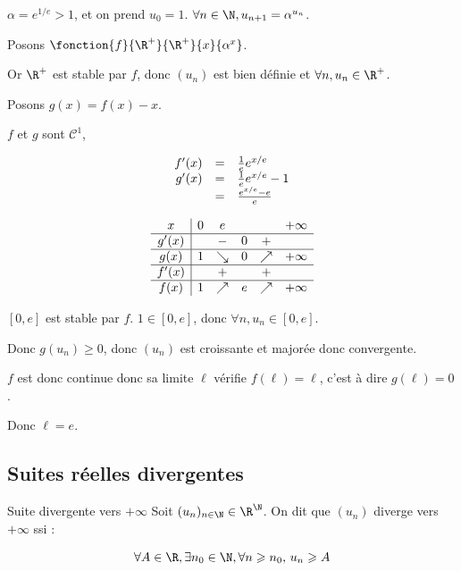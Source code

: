 \begin{exemple}
    \avspace $\alpha = e^{1/e} > 1$, et on prend $u_0 = 1$. $\forall n \in \N, u_{n + 1} = \alpha^{u_n}$.

    Posons $\fonction{f}{\R^+}{\R^+}{x}{\alpha^x}$.

    Or $\R^+$ est stable par $f$, donc $(u_n)$ est bien définie et $\forall n, u_n \in \R^+$.

    Posons $g(x) = f(x) - x$. 

    $f$ et $g$ sont $\mathscr C^1$, 

    $$\begin{array}{rcl}
        f'(x) & = & \frac 1 e e^{x/e} \\
        g'(x) & = & \frac 1 e e^{x/e} - 1 \\
        \space & = & \frac{e^{x / e} - e}{e} \\
    \end{array}
    $$

    $$
    \begin{array}{c|ccccc}
        x & 0 \space & e \space & & & + \infty \\
        \hline
        g'(x) & \space & - & 0 & + & \space \\
        \hline
        g(x) & 1 & \searrow & 0 & \nearrow & +\infty \\
        \hline
        f'(x) & \space & + & \space & + & \space \\
        \hline
        f(x) & 1 & \nearrow &  e & \nearrow & +\infty \\
    \end{array}
    $$

    $[0, e]$ est stable par $f$. $1 \in [0, e]$, donc $\forall n, u_n \in [0, e]$.

    Donc $g(u_n) \geqslant 0$, donc $(u_n)$ est croissante et majorée donc convergente. 

    $f$ est donc continue donc sa limite $\ell$ vérifie $f(\ell) = \ell$, c'est à dire 
    $g(\ell) = 0$.

    Donc $\ell = e$.
\end{exemple}

\subsection{Suites réelles divergentes}

\begin{definitionnt}{Suite divergente vers $+\infty$}{}
    Soit $(u_n)_{n \in \N} \in \R^{\N}$. On dit que $(u_n)$ diverge vers $+\infty$ ssi : 

    $$\forall A \in \R, \exists n_0 \in \N, \forall n \geqslant n_0, \, u_n \geqslant A$$
    
\end{definitionnt}

